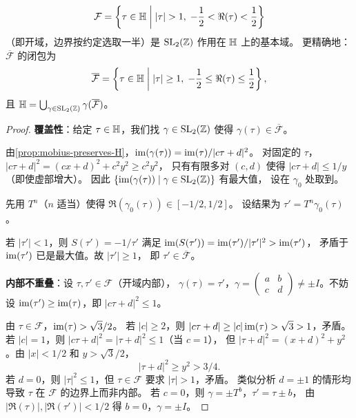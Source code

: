 \begin{theorem}[$\SL_2(\Z)$ 的标准基本域]
\label{thm:fundamental-domain}
\[
  \mathcal{F} = \left\{\tau \in \mathbb{H} \;\middle|\;
    |\tau| > 1,\; -\frac{1}{2} < \Re(\tau) < \frac{1}{2}
  \right\}
\]
（即开域，边界按约定选取一半）是 $\SL_2(\Z)$ 作用在 $\mathbb{H}$ 上的基本域。
更精确地：$\overline{\mathcal{F}}$ 的闭包为
\[
  \overline{\mathcal{F}} = \left\{\tau \in \mathbb{H} \;\middle|\;
    |\tau| \geq 1,\; -\frac{1}{2} \leq \Re(\tau) \leq \frac{1}{2}
  \right\},
\]
且 $\mathbb{H} = \bigcup_{\gamma \in \mathrm{SL}_2(\mathbb{Z})} \gamma(\overline{\mathcal{F}})$。
\end{theorem}

\begin{proof}
\textbf{覆盖性}：给定 $\tau \in \mathbb{H}$，我们找 $\gamma \in \mathrm{SL}_2(\mathbb{Z})$
使得 $\gamma(\tau) \in \overline{\mathcal{F}}$。

由\cref{prop:mobius-preserves-H}，$\operatorname{im}(\gamma(\tau)) = \operatorname{im}(\tau)/|c\tau + d|^2$。
对固定的 $\tau$，$|c\tau + d|^2 = (cx + d)^2 + c^2 y^2 \geq c^2 y^2$，
只有有限多对 $(c,d)$ 使得 $|c\tau + d| \leq 1/y$（即使虚部增大）。
因此 $\{\operatorname{im}(\gamma(\tau)) \mid \gamma \in \mathrm{SL}_2(\mathbb{Z})\}$ 有最大值，
设在 $\gamma_0$ 处取到。

先用 $T^n$（$n$ 适当）使得 $\Re(\gamma_0(\tau)) \in [-1/2, 1/2]$。
设结果为 $\tau' = T^n \gamma_0(\tau)$。

若 $|\tau'| < 1$，则 $S(\tau') = -1/\tau'$ 满足
$\operatorname{im}(S(\tau')) = \operatorname{im}(\tau')/|\tau'|^2 > \operatorname{im}(\tau')$，
矛盾于 $\operatorname{im}(\tau')$ 已是最大值。故 $|\tau'| \geq 1$，
即 $\tau' \in \overline{\mathcal{F}}$。

\textbf{内部不重叠}：设 $\tau, \tau' \in \mathcal{F}$（开域内部），
$\gamma(\tau) = \tau'$，$\gamma = \begin{pmatrix} a & b \\ c & d \end{pmatrix}
\neq \pm I$。不妨设 $\operatorname{im}(\tau') \geq \operatorname{im}(\tau)$，即
$|c\tau + d|^2 \leq 1$。

由 $\tau \in \mathcal{F}$，$\operatorname{im}(\tau) > \sqrt{3}/2$。
若 $|c| \geq 2$，则 $|c\tau + d| \geq |c|\operatorname{im}(\tau) > \sqrt{3} > 1$，矛盾。
若 $|c| = 1$，则 $|c\tau + d|^2 = |\tau + d|^2 \leq 1$（当 $c = 1$），
但 $|\tau + d|^2 = (x + d)^2 + y^2$。由 $|x| < 1/2$ 和 $y > \sqrt{3}/2$，
\[
  |\tau + d|^2 \geq y^2 > 3/4.
\]
若 $d = 0$，则 $|\tau|^2 \leq 1$，但 $\tau \in \mathcal{F}$ 要求
$|\tau| > 1$，矛盾。
类似分析 $d = \pm 1$ 的情形均导致 $\tau$ 在 $\mathcal{F}$ 的边界上而非内部。
若 $c = 0$，则 $\gamma = \pm T^b$，$\tau' = \tau \pm b$，
由 $|\Re(\tau)|, |\Re(\tau')| < 1/2$ 得 $b = 0$，$\gamma = \pm I$。
\end{proof}

